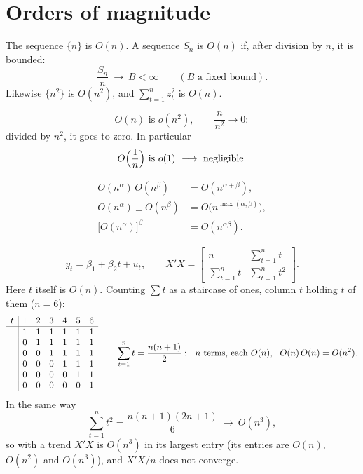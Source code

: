 \documentclass[11pt]{article}
\begin{document}
\section{Orders of magnitude}

The sequence $\{n\}$ is $O(n)$. A sequence $S_{n}$ is $O(n)$ if, after division by $n$,
it is bounded:
\[ \frac{S_{n}}{n} \ \longrightarrow\ B < \infty \qquad (B \text{ a fixed bound}). \]
Likewise $\{n^{2}\}$ is $O(n^{2})$, and $\sum_{t=1}^{n} z_{t}^{2}$ is $O(n)$.

\[ O(n) \text{ is } o(n^{2}), \qquad \frac{n}{n^{2}} \to 0: \]
divided by $n^{2}$, it goes to zero. In particular
\[ O\Bigl(\frac{1}{n}\Bigr) \text{ is } o(1) \ \longrightarrow\ \text{negligible}. \]

\begin{align*}
  O(n^{\alpha})\,O(n^{\beta}) &= O(n^{\alpha+\beta}),\\
  O(n^{\alpha}) \pm O(n^{\beta}) &= O\bigl(n^{\max(\alpha,\beta)}\bigr),\\
  \bigl[O(n^{\alpha})\bigr]^{\beta} &= O(n^{\alpha\beta}).
\end{align*}

\[ y_{t} = \beta_{1} + \beta_{2}t + u_{t}, \qquad
   X'X = \begin{bmatrix} n & \sum_{t=1}^{n} t\\[2pt] \sum_{t=1}^{n} t & \sum_{t=1}^{n} t^{2} \end{bmatrix}. \]
Here $t$ itself is $O(n)$. Counting $\sum t$ as a staircase of ones, column $t$
holding $t$ of them ($n = 6$):
\[ \begin{array}{c|cccccc}
     t & 1 & 2 & 3 & 4 & 5 & 6\\ \hline
       & 1 & 1 & 1 & 1 & 1 & 1\\
       & 0 & 1 & 1 & 1 & 1 & 1\\
       & 0 & 0 & 1 & 1 & 1 & 1\\
       & 0 & 0 & 0 & 1 & 1 & 1\\
       & 0 & 0 & 0 & 0 & 1 & 1\\
       & 0 & 0 & 0 & 0 & 0 & 1
   \end{array}
   \qquad
   \sum_{t=1}^{n} t = \frac{n(n+1)}{2}: \ \ n \text{ terms, each } O(n), \ \
   O(n)\,O(n) = O(n^{2}). \]
In the same way
\[ \sum_{t=1}^{n} t^{2} = \frac{n(n+1)(2n+1)}{6} \ \longrightarrow\ O(n^{3}), \]
so with a trend $X'X$ is $O(n^{3})$ in its largest entry (its entries are $O(n)$,
$O(n^{2})$ and $O(n^{3})$), and $X'X/n$ does not converge.
\end{document}
